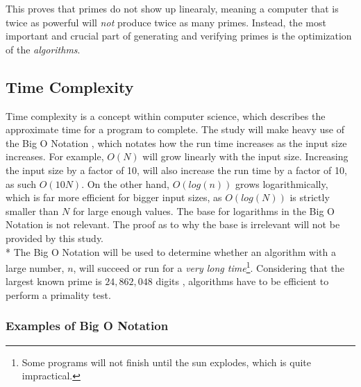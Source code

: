 \documentclass[main.tex]{subfiles}
\begin{document}
This proves that primes do not show up linearaly, meaning a computer that is twice as powerful will \textit{not} produce twice as many primes. Instead, the most important and crucial part of generating and verifying primes is the optimization of the \textit{algorithms}.

\subsection{Time Complexity}

Time complexity \cite{theorem:time_comp} is a concept within computer science, which describes the approximate time for a program to complete. The study will make heavy use of the Big O Notation \cite{theorem:big_O}, which notates how the run time increases as the input size increases. For example, $O(N)$ will grow linearly with the input size. Increasing the input size by a factor of 10, will also increase the run time by a factor of 10, as such $O(10N)$. On the other hand, $O(log(n))$ grows logarithmically, which is far more efficient for bigger input sizes, as $O(log(N))$ is strictly smaller than $N$ for large enough values. The base for logarithms in the Big O Notation is not relevant. The proof as to why the base is irrelevant will not be provided by this study.
\newline
\\*
The Big O Notation will be used to determine whether an algorithm with a large number, $n$, will succeed or run for a \textit{very long time}\footnote{Some programs will not finish until the sun explodes, which is quite impractical.}. Considering that the largest known prime is $24,862,048$ digits \cite{prime:largest_digits}, algorithms have to be efficient to perform a primality test. 

\subsubsection{Examples of Big O Notation}
\end{document}
